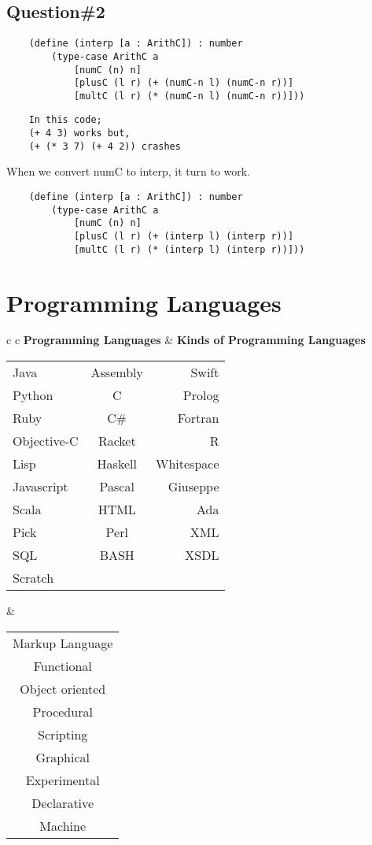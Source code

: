 \documentclass{article}
\begin{document}
\begin{flushleft}
\begin{itemize}
  \end{itemize}
  

\subsection*{Question\#2}

  \begin{verbatim}
    (define (interp [a : ArithC]) : number
        (type-case ArithC a
            [numC (n) n]
            [plusC (l r) (+ (numC-n l) (numC-n r))]
            [multC (l r) (* (numC-n l) (numC-n r))]))
  \end{verbatim}
  
  \begin{verbatim}
    In this code;
    (+ 4 3) works but,
    (+ (* 3 7) (+ 4 2)) crashes
  \end{verbatim}
  
  When we convert numC to interp, it turn to work.

  \begin{verbatim}
    (define (interp [a : ArithC]) : number
        (type-case ArithC a
            [numC (n) n]
            [plusC (l r) (+ (interp l) (interp r))]
            [multC (l r) (* (interp l) (interp r))]))
  \end{verbatim}
  
  
\section*{Programming Languages}
\begin{tabular}{c c}
 \textbf{Programming Languages} & \textbf{Kinds of Programming Languages}\\
 \begin{tabular}{ l c r }
    Java & Assembly & Swift \\
    Python & C & Prolog \\
    Ruby & C\# & Fortran \\
    Objective-C & Racket & R \\
    Lisp & Haskell & Whitespace \\
    Javascript & Pascal & Giuseppe \\
    Scala & HTML & Ada \\
    Pick & Perl & XML \\
    SQL & BASH & XSDL \\
    Scratch &  &  \\
  \end{tabular}
  &
  \begin{tabular}{ c }
    Markup Language \\
    Functional \\
    Object oriented \\
    Procedural \\
    Scripting \\
    Graphical \\
    Experimental \\
    Declarative \\
    Machine \\
  \end{tabular}
\end{tabular}



\end{flushleft}
\end{document}
